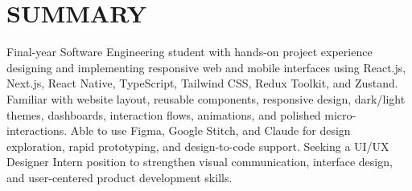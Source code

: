 \section{SUMMARY}
\noindent Final-year Software Engineering student with hands-on project experience designing and implementing responsive web and mobile interfaces using React.js, Next.js, React Native, TypeScript, Tailwind CSS, Redux Toolkit, and Zustand. Familiar with website layout, reusable components, responsive design, dark/light themes, dashboards, interaction flows, animations, and polished micro-interactions. Able to use Figma, Google Stitch, and Claude for design exploration, rapid prototyping, and design-to-code support. Seeking a UI/UX Designer Intern position to strengthen visual communication, interface design, and user-centered product development skills.
